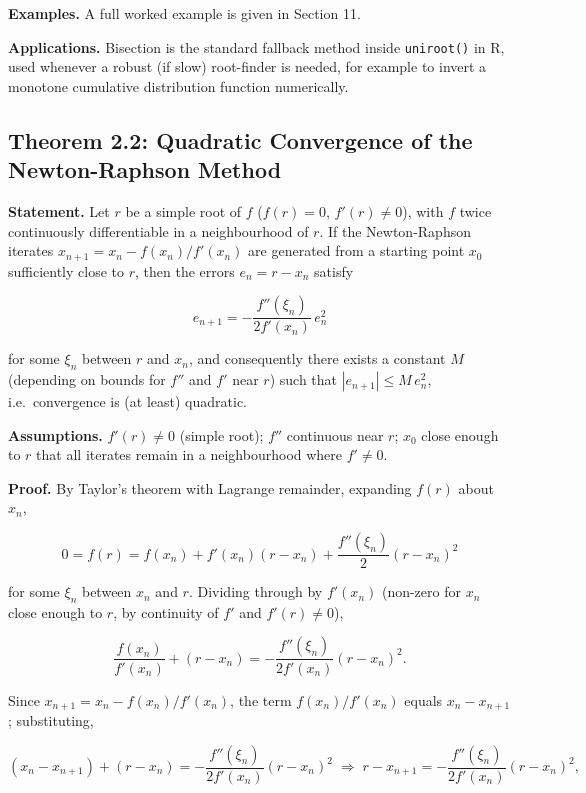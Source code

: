 \documentclass[
]{article}
\begin{document}
\textbf{Examples.} A full worked example is given in Section 11.

\textbf{Applications.} Bisection is the standard fallback method inside
\texttt{uniroot()} in R, used whenever a robust (if slow) root-finder is
needed, for example to invert a monotone cumulative distribution
function numerically.

\subsection{Theorem 2.2: Quadratic Convergence of the Newton-Raphson
Method}\label{theorem-2.2-quadratic-convergence-of-the-newton-raphson-method}

\textbf{Statement.} Let \(r\) be a simple root of \(f\) (\(f(r)=0\),
\(f'(r)\ne0\)), with \(f\) twice continuously differentiable in a
neighbourhood of \(r\). If the Newton-Raphson iterates
\(x_{n+1} = x_n - f(x_n)/f'(x_n)\) are generated from a starting point
\(x_0\) sufficiently close to \(r\), then the errors \(e_n = r-x_n\)
satisfy

\[
e_{n+1} = -\frac{f''(\xi_n)}{2f'(x_n)}\, e_n^2
\tag{2.4}
\]

for some \(\xi_n\) between \(r\) and \(x_n\), and consequently there
exists a constant \(M\) (depending on bounds for \(f''\) and \(f'\) near
\(r\)) such that \(|e_{n+1}| \le M\, e_n^2\), i.e.~convergence is (at
least) quadratic.

\textbf{Assumptions.} \(f'(r)\ne 0\) (simple root); \(f''\) continuous
near \(r\); \(x_0\) close enough to \(r\) that all iterates remain in a
neighbourhood where \(f'\ne0\).

\textbf{Proof.} By Taylor's theorem with Lagrange remainder, expanding
\(f(r)\) about \(x_n\),

\[
0 = f(r) = f(x_n) + f'(x_n)(r-x_n) + \frac{f''(\xi_n)}{2}(r-x_n)^2
\]

for some \(\xi_n\) between \(x_n\) and \(r\). Dividing through by
\(f'(x_n)\) (non-zero for \(x_n\) close enough to \(r\), by continuity
of \(f'\) and \(f'(r)\ne0\)),

\[
\frac{f(x_n)}{f'(x_n)} + (r-x_n) = -\frac{f''(\xi_n)}{2f'(x_n)}(r-x_n)^2.
\]

Since \(x_{n+1} = x_n - f(x_n)/f'(x_n)\), the term \(f(x_n)/f'(x_n)\)
equals \(x_n - x_{n+1}\); substituting,

\[
(x_n-x_{n+1}) + (r-x_n) = -\frac{f''(\xi_n)}{2f'(x_n)}(r-x_n)^2
\;\Longrightarrow\;
r - x_{n+1} = -\frac{f''(\xi_n)}{2f'(x_n)}(r-x_n)^2,
\]
\end{document}
